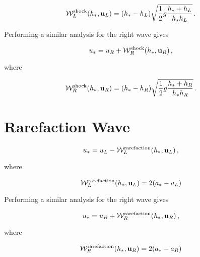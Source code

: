 \begin{equation}
  \mathcal{W}^{\text{shock}}_L(h_*,\mathbf{u}_L)
    = (h_* - h_L)
    \sqrt{\frac{1}{2}g\frac{h_* + h_L}{h_*h_L}}
    \,.
\end{equation}

Performing a similar analysis for the right wave gives

\begin{equation}\label{eq:ustarRshock}
  u_* = u_R
    + \mathcal{W}^{\text{shock}}_R(h_*,\mathbf{u}_R)
    \,,
\end{equation}

where

\begin{equation}
  \mathcal{W}^{\text{shock}}_R(h_*,\mathbf{u}_R)
    = (h_* - h_R)
    \sqrt{\frac{1}{2}g\frac{h_* + h_R}{h_*h_R}}
    \,.
\end{equation}

\section{Rarefaction Wave}
\begin{equation}\label{eq:ustarLrarefaction}
  u_* = u_L
    - \mathcal{W}^{\text{rarefaction}}_L(h_*,\mathbf{u}_L)
    \,,
\end{equation}

where

\begin{equation}
  \mathcal{W}_L^{\text{rarefaction}}(h_*,\mathbf{u}_L)
    = 2(a_* - a_L)
\end{equation}

Performing a similar analysis for the right wave gives

\begin{equation}\label{eq:ustarRrarefaction}
  u_* = u_R
    + \mathcal{W}^{\text{rarefaction}}_R(h_*,\mathbf{u}_R)
    \,,
\end{equation}

where

\begin{equation}
  \mathcal{W}_R^{\text{rarefaction}}(h_*,\mathbf{u}_R)
    = 2(a_* - a_R)
\end{equation}

